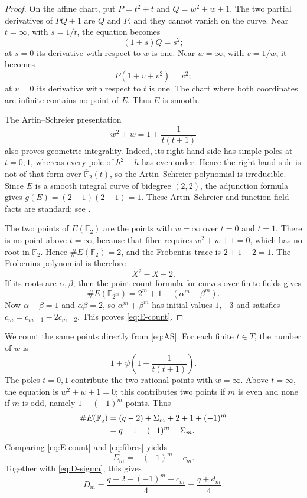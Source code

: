 \documentclass[11pt]{article}
\newcommand{\F}{\mathbb F}
\begin{document}
\begin{proof}
On the affine chart, put $P=t^2+t$ and $Q=w^2+w+1$.  The two partial
derivatives of $PQ+1$ are $Q$ and $P$, and they cannot vanish on the curve.
Near $t=\infty$, with $s=1/t$, the equation becomes
\[
 (1+s)Q=s^2;
\]
at $s=0$ its derivative with respect to $w$ is one.  Near $w=\infty$,
with $v=1/w$, it becomes
\[
 P(1+v+v^2)=v^2;
\]
at $v=0$ its derivative with respect to $t$ is one.  The chart where both
coordinates are infinite contains no point of $E$.  Thus $E$ is smooth.

The Artin--Schreier presentation
\begin{equation}\label{eq:AS}
 w^2+w=1+\frac1{t(t+1)}
\end{equation}
also proves geometric integrality.  Indeed, its right-hand side has simple
poles at $t=0,1$, whereas every pole of $h^2+h$ has even order.  Hence the
right-hand side is not of that form over $\overline{\F}_2(t)$, so the
Artin--Schreier polynomial is irreducible.  Since $E$ is a smooth integral
curve of bidegree $(2,2)$, the adjunction formula gives
$g(E)=(2-1)(2-1)=1$.  These Artin--Schreier and function-field facts are
standard; see \cite{Stichtenoth2009}.

The two points of $E(\F_2)$ are the points with $w=\infty$ over $t=0$ and
$t=1$.  There is no point above $t=\infty$, because that fibre requires
$w^2+w+1=0$, which has no root in $\F_2$.  Hence
$\#E(\F_2)=2$, and the Frobenius trace is $2+1-2=1$.  The Frobenius
polynomial is therefore
\[
 X^2-X+2.
\]
If its roots are $\alpha,\beta$, then the point-count formula for curves over
finite fields \cite{Weil1948} gives
\[
 \#E(\F_{2^m})=2^m+1-(\alpha^m+\beta^m).
\]
Now $\alpha+\beta=1$ and $\alpha\beta=2$, so
$\alpha^m+\beta^m$ has initial values $1,-3$ and satisfies
$c_m=c_{m-1}-2c_{m-2}$.  This proves \eqref{eq:E-count}.
\end{proof}

We count the same points directly from \eqref{eq:AS}.  For each finite
$t\in T$, the number of $w$ is
\[
 1+\psi\!\left(1+\frac1{t(t+1)}\right).
\]
The poles $t=0,1$ contribute the two rational points with $w=\infty$.
Above $t=\infty$, the equation is $w^2+w+1=0$; this contributes two
points if $m$ is even and none if $m$ is odd, namely $1+(-1)^m$ points.
Thus
\begin{align}
 \#E(\F_q)
  &=(q-2)+\Sigma_m+2+1+(-1)^m \notag\\
  &=q+1+(-1)^m+\Sigma_m.\label{eq:fibres}
\end{align}
Comparing \eqref{eq:E-count} and \eqref{eq:fibres} yields
\begin{equation}\label{eq:sigma-value}
 \Sigma_m=-(-1)^m-c_m.
\end{equation}
Together with \eqref{eq:D-sigma}, this gives
\begin{equation}\label{eq:D-value}
 D_m=\frac{q-2+(-1)^m+c_m}{4}=\frac{q+d_m}{4}.
\end{equation}
\end{document}
